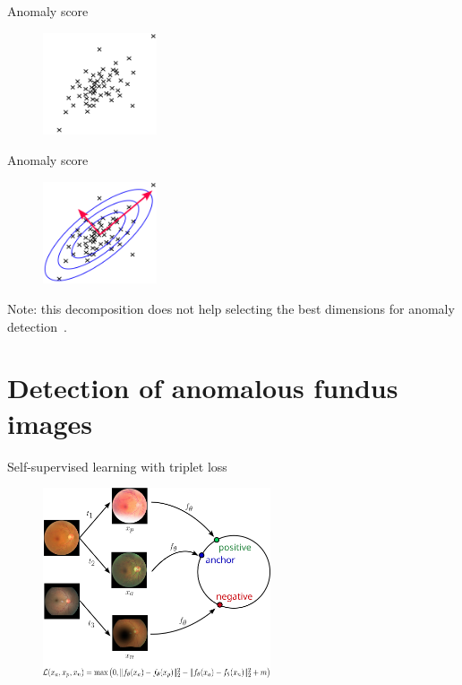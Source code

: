 \documentclass[xcolor=pdftex,dvipsnames,table,mathserif,aspectratio=169]{beamer}
\begin{document}
\begin{frame}{Anomaly score}

  \begin{figure}[ht]
    \centering
    \includegraphics[width=0.3\textwidth]{nuage}
  \end{figure}

\end{frame}


\begin{frame}{Anomaly score}

  \begin{figure}[ht]
    \centering
    \includegraphics[width=0.3\textwidth]{pca}
  \end{figure}

\pause

Note: this decomposition does not help selecting the best dimensions for anomaly detection~\cite{gula_gaussian_2023}.

\end{frame}


\section{Detection of anomalous fundus images}


\begin{frame}{Self-supervised learning with triplet loss~\cite{langrognet_self-supervised_2025}}

\begin{figure}[ht]
  \centering
  \includegraphics[width=0.6\textwidth]{ssl}
\end{figure}

\end{frame}
\end{document}
